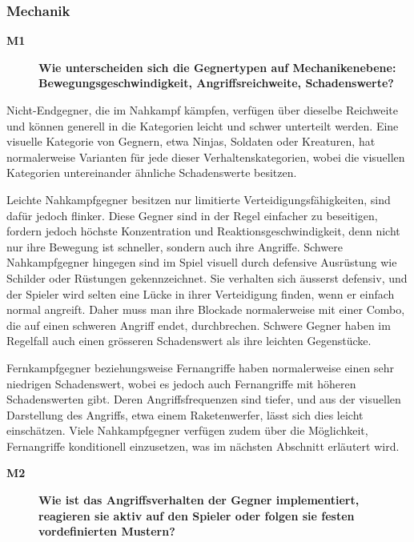 \documentclass[../Main.tex]{subfiles}
\begin{document}
\subsubsection{Mechanik}

\begin{description}
  \item[\textbf{M1}] \textbf{Wie unterscheiden sich die Gegnertypen auf Mechanikenebene: Bewegungsgeschwindigkeit, Angriffsreichweite, Schadenswerte?}
\end{description}

Nicht-Endgegner, die im Nahkampf kämpfen, verfügen über dieselbe Reichweite und können generell in die Kategorien leicht und schwer unterteilt werden. Eine visuelle Kategorie von Gegnern, etwa Ninjas, Soldaten oder Kreaturen, hat normalerweise Varianten für jede dieser Verhaltenskategorien, wobei die visuellen Kategorien untereinander ähnliche Schadenswerte besitzen.

Leichte Nahkampfgegner besitzen nur limitierte Verteidigungsfähigkeiten, sind dafür jedoch flinker. Diese Gegner sind in der Regel einfacher zu beseitigen, fordern jedoch höchste Konzentration und Reaktionsgeschwindigkeit, denn nicht nur ihre Bewegung ist schneller, sondern auch ihre Angriffe. Schwere Nahkampfgegner hingegen sind im Spiel visuell durch defensive Ausrüstung wie Schilder oder Rüstungen gekennzeichnet. Sie verhalten sich äusserst defensiv, und der Spieler wird selten eine Lücke in ihrer Verteidigung finden, wenn er einfach normal angreift. Daher muss man ihre Blockade normalerweise mit einer Combo, die auf einen schweren Angriff endet, durchbrechen. Schwere Gegner haben im Regelfall auch einen grösseren Schadenswert als ihre leichten Gegenstücke.

Fernkampfgegner beziehungsweise Fernangriffe haben normalerweise einen sehr niedrigen Schadenswert, wobei es jedoch auch Fernangriffe mit höheren Schadenswerten gibt. Deren Angriffsfrequenzen sind tiefer, und aus der visuellen Darstellung des Angriffs, etwa einem Raketenwerfer, lässt sich dies leicht einschätzen. Viele Nahkampfgegner verfügen zudem über die Möglichkeit, Fernangriffe konditionell einzusetzen, was im nächsten Abschnitt erläutert wird.

\begin{description}
  \item[\textbf{M2}] \textbf{Wie ist das Angriffsverhalten der Gegner implementiert, reagieren sie aktiv auf den Spieler oder folgen sie festen vordefinierten Mustern?}
\end{description}
\end{document}
